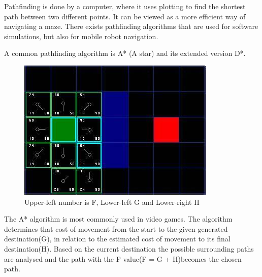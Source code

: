 Pathfinding is done by a computer, where it uses plotting to find the shortest path between two different points. It can be viewed as a more efficient way of navigating a maze.
There exists pathfinding algorithms that are used for software simulations, but also for mobile robot navigation. 

A common pathfinding algorithm is A* (A star) and its extended version D*.

\begin{figure}[H]
\centering
\includegraphics[width=.7\linewidth]{images/aStar2.jpg}
\caption{Upper-left number is F, Lower-left G and Lower-right H}
\label{fig:sub2}
\end{figure}

The A* algorithm is most commonly used in video games. The algorithm determines that cost of movement from the start to the given generated destination(G), in relation to the estimated cost of movement to its final destination(H). Based on the current destination the possible surrounding paths are analysed and the path with the F value(F = G + H)becomes the chosen path.\cite{astar}







